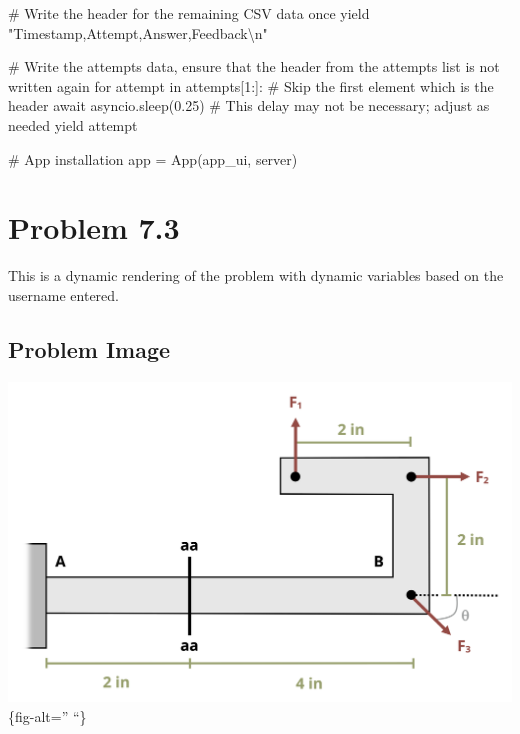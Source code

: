 \documentclass[
  letterpaper,
  DIV=11,
  numbers=noendperiod]{scrreprt}
\newenvironment{Shaded}{\begin{snugshade}}{\end{snugshade}}
\newcommand{\NormalTok}[1]{\textcolor[rgb]{0.00,0.23,0.31}{#1}}
\begin{document}
\begin{Shaded}
\begin{Highlighting}[]
\NormalTok{        \# Write the header for the remaining CSV data once}
\NormalTok{        yield "Timestamp,Attempt,Answer,Feedback\textbackslash{}n"}
        
\NormalTok{        \# Write the attempts data, ensure that the header from the attempts list is not written again}
\NormalTok{        for attempt in attempts[1:]:  \# Skip the first element which is the header}
\NormalTok{            await asyncio.sleep(0.25)  \# This delay may not be necessary; adjust as needed}
\NormalTok{            yield attempt}


\NormalTok{\# App installation}
\NormalTok{app = App(app\_ui, server)}
\end{Highlighting}
\end{Shaded}

\chapter*{Problem 7.3}\label{problem-7.3}


This is a dynamic rendering of the problem with dynamic variables based
on the username entered.

\section*{Problem Image}\label{problem-image-75}


\includegraphics{images/309.png}\{fig-alt='' ``\}
\end{document}
